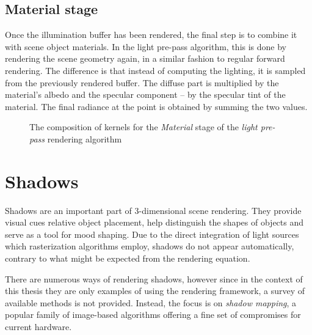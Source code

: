 \subsection{Material stage}

Once the illumination buffer has been rendered, the final step is to combine it with scene object materials. In the light pre-pass algorithm, this is done by rendering the scene geometry again, in a similar fashion to regular forward rendering. The difference is that instead of computing the lighting, it is sampled from the previously rendered buffer. The diffuse part is multiplied by the material's albedo and the specular component -- by the specular tint of the material. The final radiance at the point is obtained by summing the two values.

\begin{figure}[ht!]
  \centering
    \caption[Light Pre-Pass Stage 3]{The composition of kernels for the \emph{Material} stage of the  \emph{light pre-pass} rendering algorithm}
  \label{fig:DeferredLightingStage3}
\end{figure}

\clearpage
\section{Shadows}

Shadows are an important part of 3-dimensional scene rendering. They provide visual cues relative object placement, help distinguish the shapes of objects and serve as a tool for mood shaping. Due to the direct integration of light sources which rasterization algorithms employ, shadows do not appear automatically, contrary to what might be expected from the rendering equation.

There are numerous ways of rendering shadows, however since in the context of this thesis they are only examples of using the rendering framework, a survey of available methods is not provided. Instead, the focus is on \emph{shadow mapping}, a popular family of image-based algorithms offering a fine set of compromises for current hardware.

